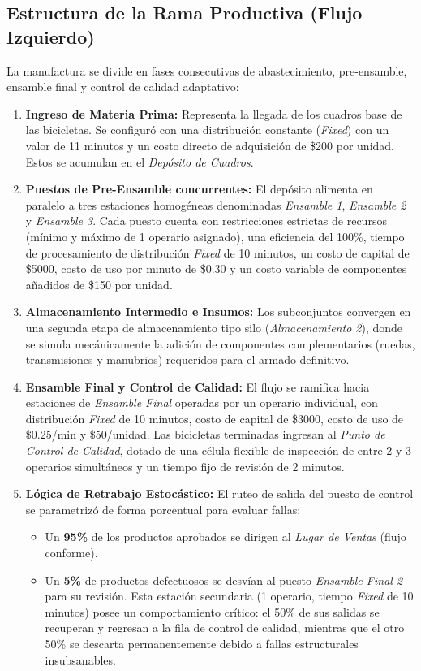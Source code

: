 \documentclass[runningheads]{llncs}
\begin{document}
\subsection{Estructura de la Rama Productiva (Flujo Izquierdo)}
La manufactura se divide en fases consecutivas de abastecimiento, pre-ensamble, ensamble final y control de calidad adaptativo:

\begin{enumerate}
    \item \textbf{Ingreso de Materia Prima:} Representa la llegada de los cuadros base de las bicicletas. Se configuró con una distribución constante (\textit{Fixed}) con un valor de 11 minutos y un costo directo de adquisición de \$200 por unidad. Estos se acumulan en el \textit{Depósito de Cuadros}.
    \item \textbf{Puestos de Pre-Ensamble concurrentes:} El depósito alimenta en paralelo a tres estaciones homogéneas denominadas \textit{Ensamble 1}, \textit{Ensamble 2} y \textit{Ensamble 3}. Cada puesto cuenta con restricciones estrictas de recursos (mínimo y máximo de 1 operario asignado), una eficiencia del 100\%, tiempo de procesamiento de distribución \textit{Fixed} de 10 minutos, un costo de capital de \$5000, costo de uso por minuto de \$0.30 y un costo variable de componentes añadidos de \$150 por unidad.
    \item \textbf{Almacenamiento Intermedio e Insumos:} Los subconjuntos convergen en una segunda etapa de almacenamiento tipo silo (\textit{Almacenamiento 2}), donde se simula mecánicamente la adición de componentes complementarios (ruedas, transmisiones y manubrios) requeridos para el armado definitivo.
    \item \textbf{Ensamble Final y Control de Calidad:} El flujo se ramifica hacia estaciones de \textit{Ensamble Final} operadas por un operario individual, con distribución \textit{Fixed} de 10 minutos, costo de capital de \$3000, costo de uso de \$0.25/min y \$50/unidad. Las bicicletas terminadas ingresan al \textit{Punto de Control de Calidad}, dotado de una célula flexible de inspección de entre 2 y 3 operarios simultáneos y un tiempo fijo de revisión de 2 minutos.
    \item \textbf{Lógica de Retrabajo Estocástico:} El ruteo de salida del puesto de control se parametrizó de forma porcentual para evaluar fallas:
    \begin{itemize}
        \item Un \textbf{95\%} de los productos aprobados se dirigen al \textit{Lugar de Ventas} (flujo conforme).
        \item Un \textbf{5\%} de productos defectuosos se desvían al puesto \textit{Ensamble Final 2} para su revisión. Esta estación secundaria (1 operario, tiempo \textit{Fixed} de 10 minutos) posee un comportamiento crítico: el 50\% de sus salidas se recuperan y regresan a la fila de control de calidad, mientras que el otro 50\% se descarta permanentemente debido a fallas estructurales insubsanables.
    \end{itemize}
\end{enumerate}
\end{document}
